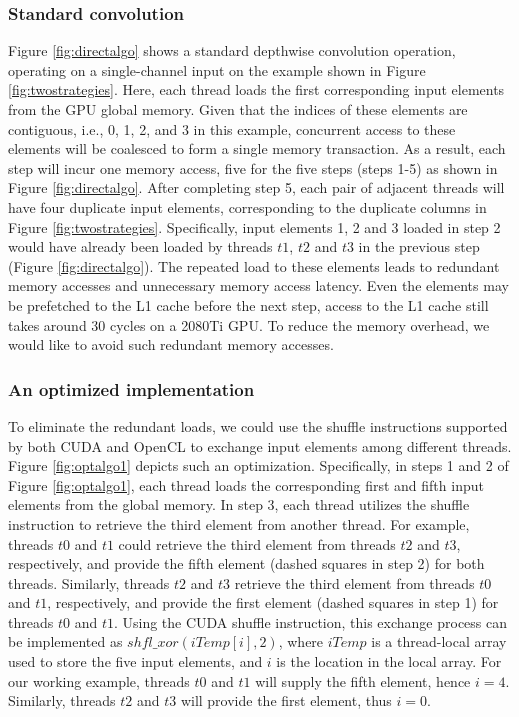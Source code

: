 \subsubsection{Standard convolution} Figure \ref{fig:directalgo} shows a standard depthwise convolution operation, operating on a single-channel input on the example shown in Figure \ref{fig:twostrategies}.
Here, each thread loads the first corresponding input elements from the GPU global memory. Given that the indices of these elements are
contiguous, i.e., 0, 1, 2, and 3 in this example, concurrent access to these elements will be coalesced to form a single memory
transaction. As a result, each step will incur one memory access, five for the five steps (steps 1-5) as shown in Figure
\ref{fig:directalgo}. After completing step 5, each pair of adjacent threads will have four duplicate input elements, corresponding to the
duplicate columns in Figure \ref{fig:twostrategies}. Specifically, input elements 1, 2 and 3 loaded in step 2 would have already been
loaded by threads $t1$, $t2$ and $t3$ in the previous step (Figure \ref{fig:directalgo}). The repeated load to these elements leads to
redundant memory accesses and unnecessary memory access latency. Even the elements may be prefetched to the L1 cache before the next step,
access to the L1 cache still takes around 30 cycles on a 2080Ti GPU. To reduce the memory overhead, we would like to avoid such redundant
memory accesses.

\subsubsection{An optimized implementation} To eliminate the redundant loads, we could use the shuffle instructions supported by both CUDA and OpenCL to exchange input elements among
different threads. Figure \ref{fig:optalgo1} depicts such an optimization. Specifically, in steps 1 and 2 of Figure \ref{fig:optalgo1},
each thread loads the corresponding first and fifth input elements from the global memory. In step 3, each thread utilizes the shuffle
instruction to retrieve the third element from another thread. For example, threads $t0$ and $t1$ could retrieve the third element from
threads $t2$ and $t3$, respectively, and provide the fifth element (dashed squares in step 2) for both threads. Similarly, threads $t2$ and
$t3$ retrieve the third element from threads $t0$ and $t1$, respectively, and provide the first element (dashed squares in step 1) for
threads $t0$ and $t1$. Using the CUDA shuffle instruction, this exchange process can be implemented as $shfl\_xor(iTemp[i],2)$, where
$iTemp$ is a thread-local array used to store the five input elements, and $i$ is the location in the local array. For our working example,
threads $t0$ and $t1$ will supply the fifth element, hence $i=4$. Similarly, threads $t2$ and $t3$ will provide the first element, thus
$i=0$.

